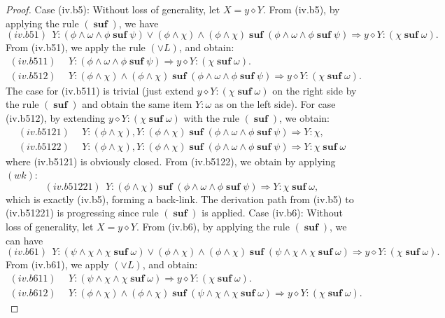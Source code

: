 \documentclass[manuscript,screen]{acmart}
\newcommand{\cat}[0]{\diamond}
\DeclareMathOperator{\osuf}{\mathbf{suf}}
\begin{document}
\begin{proof}
\ifx
Case (iv.b5): Without loss of generality, let $X = y\cat Y$.
From (iv.b5), by applying the rule $(\osuf)$, we have
$$
(iv.b51)\ \  Y : (\phi\wedge \omega\wedge \phi\osuf \psi) \vee (\phi\wedge\chi)\wedge (\phi\wedge\chi)\osuf (\phi\wedge \omega\wedge \phi\osuf \psi)\Rightarrow y\cat Y : (\chi\osuf \omega).
$$
From (iv.b51), we apply the rule $(\vee L)$, and obtain:
$$
\begin{aligned}
(iv.b511)\ \ & Y : (\phi\wedge \omega\wedge \phi\osuf \psi) \Rightarrow y\cat Y : (\chi\osuf \omega).\\
(iv.b512)\ \ & Y : (\phi\wedge\chi)\wedge (\phi\wedge\chi)\osuf (\phi\wedge \omega\wedge \phi\osuf \psi) \Rightarrow y\cat Y : (\chi\osuf \omega). 
\end{aligned}
$$
The case for (iv.b511) is trivial (just extend $y\cat Y : (\chi\osuf \omega)$ on the right side by the rule $(\osuf)$ and obtain the same item $Y : \omega$ as on the left side).
For case (iv.b512), by extending $y\cat Y : (\chi\osuf\omega)$ with the rule $(\osuf)$, we obtain:
$$
\begin{aligned}
(iv.b5121)\ \ & Y : (\phi\wedge\chi), Y : (\phi\wedge\chi)\osuf (\phi\wedge \omega\wedge \phi\osuf \psi) \Rightarrow Y : \chi,\\
(iv.b5122)\ \ & Y : (\phi\wedge\chi), Y : (\phi\wedge\chi)\osuf (\phi\wedge \omega\wedge \phi\osuf \psi) \Rightarrow Y : \chi\osuf \omega
\end{aligned}
$$
where (iv.b5121) is obviously closed.
From (iv.b5122), we obtain by applying $(wk)$:
$$
(iv.b51221)\ \ Y : (\phi\wedge\chi)\osuf (\phi\wedge \omega\wedge \phi\osuf \psi) \Rightarrow Y : \chi\osuf \omega, 
$$
which is exactly (iv.b5), forming a back-link.
The derivation path from (iv.b5) to (iv.b51221) is progressing since rule $(\osuf)$ is applied.
\fi
\ifx
Case (iv.b6): Without loss of generality, let $X = y\cat Y$.
From (iv.b6), by applying the rule $(\osuf)$, we can have
$$
(iv.b61)\ \  Y : (\psi\wedge \chi\wedge \chi\osuf\omega) \vee (\phi\wedge\chi)\wedge (\phi\wedge\chi)\osuf (\psi\wedge \chi\wedge \chi\osuf\omega)\Rightarrow y\cat Y : (\chi\osuf \omega). 
$$
From (iv.b61), we apply $(\vee L)$, and obtain:
$$
\begin{aligned}
(iv.b611)\ \ & Y : (\psi\wedge \chi\wedge \chi\osuf\omega) \Rightarrow y\cat Y : (\chi\osuf \omega).\\
(iv.b612)\ \ & Y : (\phi\wedge\chi)\wedge (\phi\wedge\chi)\osuf (\psi\wedge \chi\wedge \chi\osuf\omega) \Rightarrow y\cat Y : (\chi\osuf \omega).
\end{aligned}
$$
\end{proof}
\end{document}

